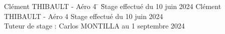\begin{titlepage}
    \begin{tabbing}
        Clément THIBAULT - Aéro 4 \= \hspace{6cm} \= Stage effectué du 10 juin 2024 \kill
        Clément THIBAULT - Aéro 4 \> \> Stage effectué du 10 juin 2024 \\
        Tuteur de stage : Carlos MONTILLA \> \> au 1 septembre 2024
    \end{tabbing}
    \vspace*{1cm}

\end{titlepage}